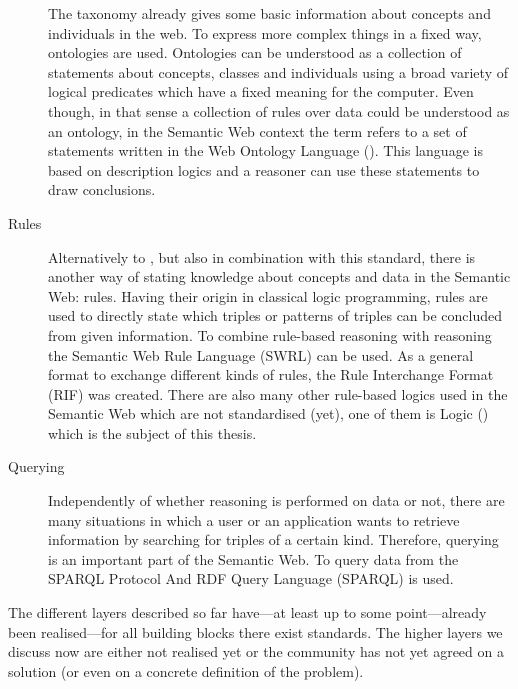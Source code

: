 \begin{description}
 The taxonomy already gives some basic information about concepts and individuals in the web. To express more complex things in a fixed way, ontologies are used. 
 Ontologies can be understood as a collection of statements about concepts, classes and individuals using a broad variety of logical predicates which have a fixed meaning for the computer.
 Even though, in that sense a collection of rules over \rdf data could be understood as an ontology,  in the Semantic Web context the term refers to a set of statements written in the Web 
 Ontology Language (\owl). This language is based on description logics and a reasoner can use these statements to draw conclusions.
 \item[Rules] Alternatively to \owl, but also in combination with this standard, there is another way of stating knowledge about concepts and data in the Semantic Web: rules. 
 Having their origin in classical logic programming, rules are used to directly state which triples or patterns of triples can be concluded from given information. To combine rule-based reasoning 
 with \owl reasoning the Semantic Web Rule Language (SWRL) can be used. As a general format to exchange different kinds of rules, the Rule Interchange Format (RIF) was created. 
 There are also many other 
 rule-based logics used in the Semantic Web which are not standardised (yet), one of them is \notationthree Logic (\nthreelogic) 
 which is the subject of this thesis.
 \item[Querying] Independently of whether reasoning is performed on \rdf data or not, there are many situations in which a user or an application wants to retrieve information 
 by searching for triples of a certain kind. Therefore, querying is an important part of the Semantic Web. To query data from \rdf the SPARQL Protocol And RDF Query Language (SPARQL) is used.
 \end{description}
 The different layers described so far have---at least up to some point---already been realised---for all building blocks there exist standards. 
 The higher layers we discuss now
are either not realised yet or the community has not yet agreed on a solution (or even on a concrete definition of the problem). 
